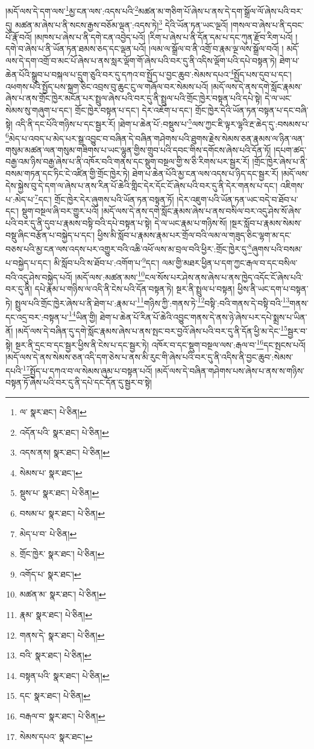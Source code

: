 །མདོ་ལས་དེ་དག་ལས་\footnote{ལ་  སྣར་ཐང་།  པེ་ཅིན། }མྱ་ངན་ལས་:འདས་པའི་\footnote{འདོན་པའི་  སྣར་ཐང་།  པེ་ཅིན། }མཚན་མ་གཅིག་པོ་ཞེས་པ་ནས་དེ་དག་སྒྲོལ་ལོ་ཞེས་པའི་བར་དུ། མཚན་མ་ཞེས་པ་ནི་སངས་རྒྱས་བཅོམ་ལྡན་:འདས་ཏེ།\footnote{འདས་ནས།  སྣར་ཐང་།  པེ་ཅིན། } དེའི་ཡོན་ཏན་ཡང་ལྔའོ། །གསལ་བ་ཞེས་པ་ནི་དབང་པོ་རྣོ་བའོ། །མཁས་པ་ཞེས་པ་ནི་དགེ་ངན་འབྱེད་པའོ། །རིག་པ་ཞེས་པ་ནི་དོན་དམ་པ་དང་ཀུན་རྫོབ་རིག་པའོ། །དགེ་བ་ཞེས་པ་ནི་ཡོན་ཏན་ཐམས་ཅད་དང་ལྡན་པའོ། །ལམ་ལ་སྒྲོལ་བ་ནི་འགྲོ་བ་རྣམ་ལྔ་ལས་སྒྲོལ་བའོ། །
མདོ་ལས་དེ་དག་འགྲོ་བ་མང་པོ་ཞེས་པ་ནས་སླར་ལྡོག་གོ་ཞེས་པའི་བར་དུ་ནི་འདིས་ལྡོག་པའི་དཔེ་བསྟན་ཏེ། ཐེག་པ་ཆེན་པོའི་སྒྲུབ་པ་བསྐལ་པ་དྲུག་ཅུའི་བར་དུ་དཀའ་བ་སྤྱོད་པ་བྱང་ཆུབ་:སེམས་དཔའ་\footnote{སེམས་པ་  སྣར་ཐང་། }སྤྱོད་པས་དུབ་པ་དང་། འཕགས་པའི་སྤྱོད་པས་སྐྲག་ཅིང་འབྲས་བུ་ཆུང་ངུ་ལ་གཞོལ་བར་སེམས་པའོ། །མདོ་ལས་དེ་ནས་དགེ་སློང་རྣམས་ཞེས་པ་ནས་གྲོང་ཁྱེར་མངོན་པར་སྤྲུལ་ཞེས་པའི་བར་དུ་ནི་སྤྲུལ་པའི་གྲོང་ཁྱེར་བསྟན་པའི་དཔེ་སྟེ། དེ་ལ་ཡང་སེམས་སུ་གཞུག་པ་དང་། གྲོང་ཁྱེར་བསྟན་པ་དང་། དེར་འཇོག་པ་དང་། གྲོང་ཁྱེར་དེའི་ཡོན་ཏན་བསྟན་པ་དང་བཞི་སྟེ། འདི་ནི་དང་པོའི་གཉིས་པ་དང་སྦྱར་རོ། །ཐེག་པ་ཆེན་པོ་:བསྡུས་པ་\footnote{སྡུས་པ་  སྣར་ཐང་།  པེ་ཅིན། }ལས་ཀྱང་ཇི་ལྟར་ལྷའི་རྔ་ཆེད་དུ་:བསམས་པ་\footnote{བསམ་པ་  སྣར་ཐང་།  པེ་ཅིན། }མེད་པ་འབད་པ་མེད་པར་སྒྲ་འབྱུང་བ་བཞིན་དེ་བཞིན་གཤེགས་པའི་ཐུགས་རྗེས་སེམས་ཅན་རྣམས་ལ་ཉིན་ལན་གསུམ་མཚན་ལན་གསུམ་གཟིགས་པ་ཡང་ལྷུན་གྱིས་གྲུབ་པའི་དབང་གིས་དགོངས་ཞེས་པའི་དོན་ཏོ། །དཔག་ཚད་བརྒྱ་འམ་ཉིས་བརྒྱ་ཞེས་པ་ནི་འཁོར་བའི་གནས་དང་སྡུག་བསྔལ་གྱི་ས་ཅི་རིགས་པར་སྦྱར་རོ། །གྲོང་ཁྱེར་ཞེས་པ་ནི་བསམ་གཏན་དང་ཏིང་ངེ་འཛིན་གྱི་གྲོང་ཁྱེར་ཏེ། ཐེག་པ་ཆེན་པོའི་མྱ་ངན་ལས་འདས་པ་ཉིད་དང་སྦྱར་རོ། །མདོ་ལས་དེས་སྐྱེས་བུ་དེ་དག་ལ་ཞེས་པ་ནས་རིན་པོ་ཆེའི་གླིང་དེར་དོང་ངོ་ཞེས་པའི་བར་དུ་ནི་དེར་གནས་པ་དང་། འཇིགས་པ་:མེད་པ་\footnote{མེད་པ་བ་  པེ་ཅིན། }དང་། གྲོང་ཁྱེར་དེར་ཞུགས་པའི་ཡོན་ཏན་བསྟན་ཏོ། །དེར་འཇུག་པའི་ཡོན་ཏན་ཡང་བདེ་བ་ཐོབ་པ་དང་། སྡུག་བསྔལ་ཞི་བར་གྱུར་པའོ། །མདོ་ལས་དེ་ནས་དགེ་སློང་རྣམས་ཞེས་པ་ནས་བསིལ་བར་འདུ་ཤེས་སོ་ཞེས་པའི་བར་དུ་ནི་དུབ་པ་རྣམས་བསྟི་བའི་དཔེ་བསྟན་པ་སྟེ། དེ་ལ་ཡང་རྣམ་པ་གཉིས་སོ། །སྔར་སློབ་པ་རྣམས་སེམས་བསྡུ་ཞིང་བརྩོན་པ་བསྐྱེད་པ་དང་། ཕྱིས་མི་སློབ་པ་རྣམས་རྣམ་པར་གྲོལ་བའི་ལམ་ལ་གཟུད་ཅིང་ལྷག་མ་དང་བཅས་པའི་མྱ་ངན་ལས་འདས་པར་འགྱུར་བའི་འཆི་འཕོ་ལས་མ་བྲལ་བའི་ཕྱིར་:གྲོང་ཁྱེར་དུ་\footnote{གྲོང་ཁྱེར་  སྣར་ཐང་།  པེ་ཅིན། }ཞུགས་པའི་བསམ་པ་བསྐྱེད་པ་དང་། མི་སློབ་པའི་ས་ཐོབ་པ་:འགོག་པ་\footnote{འགོད་པ་  སྣར་ཐང་། }དང་། ལམ་གྱི་མཐར་ཕྱིན་པ་དག་ཀྱང་རྒལ་བ་དང་བསིལ་བའི་འདུ་ཤེས་བསྐྱེད་པའོ། །མདོ་ལས་:མཚན་མས་\footnote{མཚན་མ་  སྣར་ཐང་།  པེ་ཅིན། }ངལ་སོས་པར་ཤེས་ནས་ཞེས་པ་ནས་ཁྱེད་འདོང་ངོ་ཞེས་པའི་བར་དུ་ནི། དཔེ་རྣམ་པ་གཉིས་ལ་འདི་ནི་ངེས་པའི་དོན་བསྟན་ཏེ། སྔར་ནི་སྤྲུལ་པ་བསྟན། ཕྱིས་ནི་ཡང་དག་པ་བསྟན་ཏེ། སྤྲུལ་པའི་གྲོང་ཁྱེར་ཞེས་པ་ནི་ཐེག་པ་:རྣམ་པ་\footnote{རྣམ་  སྣར་ཐང་།  པེ་ཅིན། }གཉིས་ཀྱི་:གནས་ཏེ་\footnote{གནས་དེ་  སྣར་ཐང་།  པེ་ཅིན། }བསྟི་:བའི་གནས་དེ་བསྟི་བའི་\footnote{བའི་  སྣར་ཐང་།  པེ་ཅིན། }གནས་དང་འདྲ་བར་:བསྟན་པ་\footnote{བསྟན་པའི་  སྣར་ཐང་།  པེ་ཅིན། }ཡིན་གྱི། ཐེག་པ་ཆེན་པོ་རིན་པོ་ཆེའི་འབྱུང་གནས་དེ་ནས་ཉེ་ཞེས་པར་དཔེ་སྨྲས་པ་ཡིན་ནོ། །མདོ་ལས་དེ་བཞིན་དུ་དགེ་སློང་རྣམས་ཞེས་པ་ནས་སྤང་བར་བྱའོ་ཞེས་པའི་བར་དུ་ནི་དོན་ཕྱི་མ་དེང་\footnote{དང་  སྣར་ཐང་།  པེ་ཅིན། }སྦྱར་བ་སྟེ། སྔར་ནི་དྲང་བ་དང་སྦྱར་ཕྱིས་ནི་ངེས་པ་དང་སྦྱར་ཏེ། འཁོར་བ་དང་སྡུག་བསྔལ་ལས་:རྒལ་བ་\footnote{བརྒལ་བ་  སྣར་ཐང་།  པེ་ཅིན། }དང་སྤངས་པའོ། །མདོ་ལས་དེ་ནས་སེམས་ཅན་འདི་དག་ཅེས་པ་ནས་མི་རུང་གི་ཞེས་པའི་བར་དུ་ནི་འདིས་ནི་བྱང་ཆུབ་:སེམས་དཔའི་\footnote{སེམས་དཔའ་  སྣར་ཐང་། }སྤྱོད་པ་དཀའ་བ་ལ་སེམས་ཞུམ་པ་བསྟན་པའོ། །མདོ་ལས་དེ་བཞིན་གཤེགས་པས་ཞེས་པ་ནས་ས་གཉིས་བསྟན་ཏོ་ཞེས་པའི་བར་དུ་ནི་དཔེ་དང་དོན་དུ་སྦྱར་བ་སྟེ། 